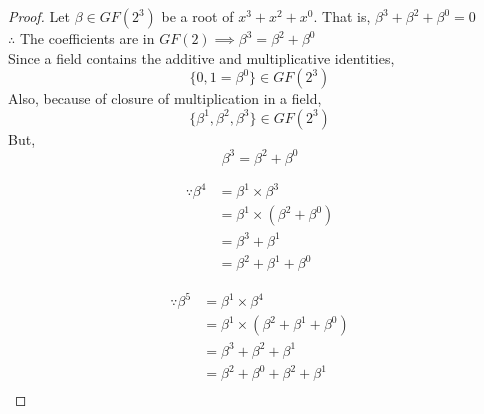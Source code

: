 \documentclass[12pt]{extarticle}
\begin{document}
        \begin{proof}

            Let $\beta \in GF(2^{3})$ be a root of $x^3+x^2+x^0$. That is, $\beta^{3}+\beta^{2}+\beta^{0}=0$\\
            $\therefore$ The coefficients are in $GF(2) \implies \beta^{3}=\beta^{2}+\beta^{0}$\\
            Since a field contains the additive and multiplicative identities,
            \begin{equation*}
                \{ 0, 1=\beta^{0} \} \in GF(2^{3})
            \end{equation*}
            Also, because of closure of multiplication in a field,
            \begin{equation*}
                \{\beta^{1}, \beta^{2}, \beta^{3}\} \in GF(2^{3})
            \end{equation*}
            But,
            \begin{equation*}
                \beta^{3} = \beta^{2} + \beta^{0}
            \end{equation*}
            \begin{minipage}[t]{0.5\textwidth}
                \begin{equation*}
                    \begin{split}
                        \because \beta^{4} & = \beta^{1} \times \beta^{3} \\
                        & = \beta^{1} \times(\beta^{2}+\beta^{0}) \\
                        & = \beta^{3}+\beta^{1} \\
                        & = \beta^{2}+\beta^{1}+\beta^{0}
                    \end{split}
                \end{equation*}
            \end{minipage}
            \begin{minipage}[t]{0.5\textwidth}
                \begin{equation*}
                    \begin{split}
                        \because \beta^{5} & = \beta^{1} \times \beta^{4} \\
                        & = \beta^{1} \times(\beta^{2}+\beta^{1}+\beta^{0}) \\
                        & = \beta^{3}+\beta^{2}+\beta^{1} \\
                        & = \beta^{2}+\beta^{0}+\beta^{2}+\beta^{1} \\

\end{split}
\end{equation*}
\end{minipage}
\end{proof}
\end{document}
